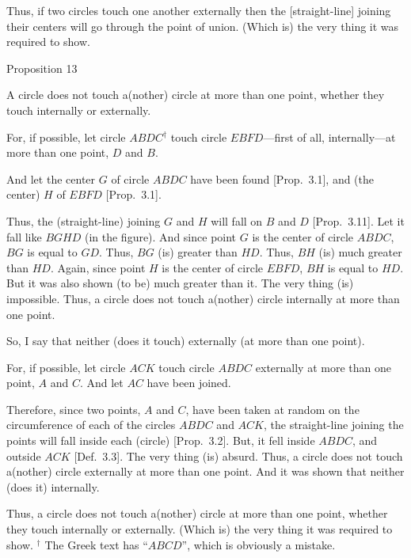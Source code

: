 Thus, if two circles touch one another externally then the [straight-line]
joining their centers will go through the point of union. (Which is)
the very thing it was required to show.


\begin{center}
{\large Proposition 13}
\end{center}

A circle does not touch a(nother) circle at more than one point, whether they
touch internally or externally.

\epsfysize=2.2in
\centerline{}

For, if possible, let circle $ABDC$$^\dag$ touch circle $EBFD$---first of all, internally---at more than one point, $D$ and $B$.

And let the center $G$ of circle $ABDC$ have been found [Prop.~3.1], and
(the center) $H$ of $EBFD$ [Prop.~3.1].

Thus, the (straight-line) joining $G$ and $H$ will fall on $B$ and $D$ [Prop.~3.11].
Let it fall like $BGHD$ (in the figure). And since point $G$ is the center of
circle $ABDC$, $BG$ is  equal to $GD$. Thus, $BG$ (is) greater than $HD$.
Thus, $BH$ (is) much greater than $HD$. Again, since point $H$ is the
center of circle $EBFD$, $BH$ is equal to $HD$. But it was also shown
(to be) much greater than it. The very thing (is) impossible.
Thus, a circle does not touch a(nother) circle internally at more than one point.

So, I say that neither (does it touch) externally (at more than one point).

For, if possible, let circle $ACK$ touch circle $ABDC$ externally at more
than one point, $A$ and $C$. And let $AC$ have been joined.

Therefore, since  two points, $A$ and $C$,
have been taken at random on the circumference
of each of the circles $ABDC$ and $ACK$, the straight-line joining
the points will fall inside each (circle) [Prop.~3.2]. But, it fell
inside $ABDC$, and outside $ACK$ [Def.~3.3]. The very thing (is) absurd.
Thus, a circle does not touch a(nother) circle externally  at more than one
point. And it was shown that neither (does it) internally.

Thus, a circle does not touch a(nother) circle at more than one point, whether they touch internally or externally. (Which is) the very thing it was required to
show.
{\footnotesize \noindent$^\dag$ The Greek text has ``$ABCD$'', which is obviously a mistake.}


